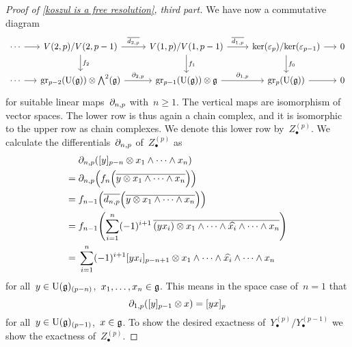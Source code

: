 \begin{proof}[Proof of \cref{koszul is a free resolution}, third part]
  We have now a commutative diagram
  \[
    \begin{tikzcd}
      \dotsb
      \arrow{r}
      &[-1em]
      V(2,p) / V(2, p-1)
      \arrow{r}[above]{\induced{d_{2,p}}}
      \arrow{d}[right]{f_2}
      &
      V(1,p) / V(1, p-1)
      \arrow{r}[above]{\induced{d_{1,p}}}
      \arrow{d}[right]{f_1}
      &
      \ker(\varepsilon_p) / {\ker(\varepsilon_{p-1})}
      \arrow{r}
      \arrow{d}[right]{f_0}
      &[-1em]
      0
      \\
      \dotsb
      \arrow{r}
      &
      \gr[p-2]( \Univ(\glie) ) \otimes \Exterior^2(\glie)
      \arrow{r}[above]{\del_{2,p}}
      &
      \gr[p-1]( \Univ(\glie) ) \otimes \glie
      \arrow{r}[above]{\del_{1,p}}
      &
      \gr[p]( \Univ(\glie) )
      \arrow{r}
      &
      0
    \end{tikzcd}
  \]
  for suitable linear maps~$\partial_{n,p}$ with~$n \geq 1$.
  The vertical maps are isomorphism of vector spaces.
  The lower row is thus again a chain complex, and it is isomorphic to the upper row as chain complexes.
  We denote this lower row by~$Z^{(p)}_\bullet$.
  We calculate the differentials~$\partial_{n,p}$ of~$Z^{(p)}_\bullet$ as
  \begin{align*}
    {}&
    \partial_{n,p}( \lbrack y \rbrack_{p-n} \otimes x_1 \wedge \dotsb \wedge x_n )
    \\
    ={}&
    \partial_{n,p}\Bigl( f_n\Bigl( \overline{ y \otimes x_1 \wedge \dotsb \wedge x_n } \Bigr) \Bigr) 
    \\
    ={}&
    f_{n-1}\Bigl( \overline{d_{n,p}}\Bigl( \overline{ y \otimes x_1 \wedge \dotsb \wedge x_n } \Bigr) \Bigr)
    \\
    ={}&
    f_{n-1}
    \Biggl(
      \sum_{i=1}^n
      (-1)^{i+1}
      \,
      \overline{ (y x_i) \otimes x_1 \wedge \dotsb \wedge \widehat{x_i} \wedge \dotsb \wedge x_n }
    \Biggr)
    \\
    ={}&
    \sum_{i=1}^n
    (-1)^{i+1}
    \lbrack y x_i \rbrack_{p-n+1} \otimes x_1 \wedge \dotsb \wedge \widehat{x_i} \wedge \dotsb \wedge x_n
  \end{align*}
  for all~$y \in \operatorname{U}(\mathfrak{g})_{(p-n)}$,~$x_1, \dotsc, x_n \in \mathfrak{g}$.
  This means in the space case of~$n = 1$ that
  \[
    \partial_{1,p}( \lbrack y \rbrack_{p-1} \otimes x )
    =
    \lbrack yx \rbrack_p
  \]
  for all~$y \in \operatorname{U}(\mathfrak{g})_{(p-1)}$,~$x \in \mathfrak{g}$.
  To show the desired exactness of~$Y^{(p)}_\bullet / Y^{(p-1)}_\bullet$ we show the exactness of~$Z^{(p)}_\bullet$.


\end{proof}
